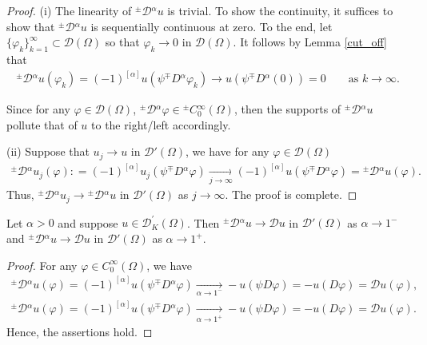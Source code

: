 \documentclass[leqno,final]{siamltex}
\numberwithin{equation}{section}
\renewcommand{\(}{\bigl(}
\renewcommand{\)}{\bigr)}
\begin{document}
    \begin{proof}
       (i) The linearity of ${^{\pm}}{\mathcal{D}}{^{\alpha}} u$ is trivial. 
       To show the continuity, it suffices to show that ${^{\pm}}{\mathcal{D}}{^{\alpha}} u$ 
       is sequentially continuous at zero. To the end, let $\{\varphi_k\}_
       {k=1}^{\infty} \subset \mathscr{D}(\Omega)$ so that 
       $\varphi_k \rightarrow 0$ in $\mathscr{D}(\Omega)$. It follows by Lemma \ref{cut_off} that 
        \begin{align*}
           {^{\pm}}{\mathcal{D}}{^{\alpha}}u(\varphi_k) = (-1)^{[\alpha]} u(\psi {^{\mp}}{D}{^{\alpha}} \varphi_k) \to   u(\psi {^{\mp}}{D}{^{\alpha}} (0)) = 0
           \qquad\mbox{as }k\to \infty.
        \end{align*}
        
        Since for any $\varphi \in  \mathscr{D}(\Omega)$, ${^{\pm}}{\mathcal{D}}{^{\alpha}}\varphi
        \in {^{\pm}}{C}{^{\infty}_{0}}(\Omega)$, then the supports of ${^{\pm}}{\mathcal{D}}{^{\alpha}}u$
        pollute that of $u$ to the right/left accordingly.  
        
        (ii) Suppose that $u_j \to u$ in $\mathscr{D}'(\Omega)$, we have for any $\varphi\in \mathscr{D}(\Omega)$
        \begin{align*}
        {^{\pm}}{\mathcal{D}}{^{\alpha}} u_j (\varphi) : = (-1)^{[\alpha]} u_j (\psi {^{\mp}}{D}{^{\alpha}} \varphi) 
        \underset{j\to \infty}{\longrightarrow}  (-1)^{[\alpha]} u( \psi {^{\mp}}{D}{^{\alpha}} \varphi) 
        ={^{\pm}}{\mathcal{D}}{^{\alpha}} u(\varphi).
        \end{align*}
        Thus, ${^{\pm}}{\mathcal{D}}{^{\alpha}} u_j \rightarrow {^{\pm}}{\mathcal{D}}{^{\alpha}} u$ in $\mathscr{D}'(\Omega)$ as $j\to\infty$.
        The proof is complete.
    \end{proof}

 
    \begin{proposition}
        Let $\alpha>0$ and suppose $u \in \mathscr{D}^\prime_K(\Omega)$. Then ${^{\pm}}{\mathcal{D}}{^{\alpha}} u  \to \mathcal{D}u $ in $\mathscr{D}'(\Omega)$ as $\alpha \rightarrow 1^-$ and ${^{\pm}}{\mathcal{D}}{^{\alpha}} u  \to \mathcal{D}u $ in $\mathscr{D}'(\Omega)$ as $\alpha \rightarrow 1^+$.
    \end{proposition}

    \begin{proof}
        For any $\varphi \in C^{\infty}_{0}(\Omega)$, we have 
        \begin{align*}
             {^{\pm}}{\mathcal{D}}{^{\alpha}} u (\varphi) = (-1)^{[\alpha]}   u(\psi {^{\mp}}{D}{^{\alpha}} \varphi) \underset{\alpha\to 1^-}{\longrightarrow}  -u(\psi D \varphi)= -u(D\varphi) = \mathcal{D}u(\varphi),\\
              {^{\pm}}{\mathcal{D}}{^{\alpha}} u (\varphi) = (-1)^{[\alpha]}   u(\psi {^{\mp}}{D}{^{\alpha}} \varphi) \underset{\alpha\to 1^+}{\longrightarrow}  - u(\psi D \varphi)=-u(D\varphi) =\mathcal{D}u(\varphi). 
        \end{align*}
        Hence, the assertions hold.
    \end{proof}
\end{document}
